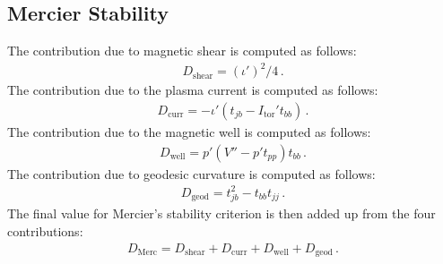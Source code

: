 \subsection{Mercier Stability}

The contribution due to magnetic shear is computed as follows:
\begin{align}
 D_\textrm{shear} = (\iota')^2 / 4 \, .
\end{align}
%
The contribution due to the plasma current is computed as follows:
\begin{align}
 D_\textrm{curr} = -\iota' (t_{jb} - I_\textrm{tor}' t_{bb}) \, .
\end{align}
%
The contribution due to the magnetic well is computed as follows:
\begin{align}
 D_\textrm{well} = p' (V'' - p' t_{pp}) t_{bb} \, .
\end{align}
%
The contribution due to geodesic curvature is computed as follows:
\begin{align}
 D_\textrm{geod} = t_{jb}^2 - t_{bb} t_{jj} \, .
\end{align}
%
The final value for Mercier's stability criterion is then added up from the four contributions:
\begin{align}
 D_\textrm{Merc} = D_\textrm{shear} + D_\textrm{curr} + D_\textrm{well} + D_\textrm{geod}\, .
\end{align}
